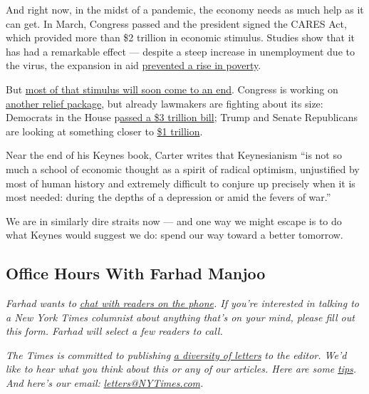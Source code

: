 And right now, in the midst of a pandemic, the economy needs as much
help as it can get. In March, Congress passed and the president signed
the CARES Act, which provided more than \$2 trillion in economic
stimulus. Studies show that it has had a remarkable effect --- despite a
steep increase in unemployment due to the virus, the expansion in aid
\href{https://www.nytimes3xbfgragh.onion/2020/06/21/us/politics/coronavirus-poverty.html}{prevented
a rise in poverty}.

But
\href{https://www.nytimes3xbfgragh.onion/2020/06/21/us/politics/coronavirus-poverty.html}{most
of that stimulus will soon come to an end}. Congress is working on
\href{https://www.cnn.com/2020/07/21/politics/stimulus-negotiations-congress-latest/index.html}{another
relief package}, but already lawmakers are fighting about its size:
Democrats in the House
p\href{https://www.nytimes3xbfgragh.onion/2020/05/15/us/politics/house-simulus-vote.html}{assed
a \$3 trillion bill}; Trump and Senate Republicans are looking at
something closer to
\href{https://www.cbsnews.com/news/coronavirus-relief-bill-phase-4-trump-republicans-1-trillion/}{\$1
trillion}.

Near the end of his Keynes book, Carter writes that Keynesianism ``is
not so much a school of economic thought as a spirit of radical
optimism, unjustified by most of human history and extremely difficult
to conjure up precisely when it is most needed: during the depths of a
depression or amid the fevers of war.''

We are in similarly dire straits now --- and one way we might escape is
to do what Keynes would suggest we do: spend our way toward a better
tomorrow.

\hypertarget{office-hours-with-farhad-manjoo}{%
\subsection{Office Hours With Farhad
Manjoo}\label{office-hours-with-farhad-manjoo}}

\emph{Farhad wants to}
\href{https://www.nytimes3xbfgragh.onion/2019/05/16/opinion/farhad-office-hours.html?module=inline}{\emph{chat
with readers on the phone}}\emph{. If you're interested in talking to a
New York Times columnist about anything that's on your mind, please fill
out this form. Farhad will select a few readers to call.}

\emph{The Times is committed to publishing}
\href{https://www.nytimes3xbfgragh.onion/2019/01/31/opinion/letters/letters-to-editor-new-york-times-women.html}{\emph{a
diversity of letters}} \emph{to the editor. We'd like to hear what you
think about this or any of our articles. Here are some}
\href{https://help.nytimes3xbfgragh.onion/hc/en-us/articles/115014925288-How-to-submit-a-letter-to-the-editor}{\emph{tips}}\emph{.
And here's our email:}
\href{mailto:letters@NYTimes.com}{\emph{letters@NYTimes.com}}\emph{.}

